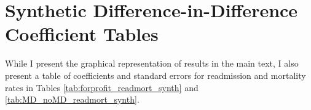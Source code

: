 \documentclass[12pt]{article}
\begin{document}




\section{Synthetic Difference-in-Difference Coefficient Tables}

While I present the graphical representation of results in the main text, I also present a table of coefficients and standard errors for readmission and mortality rates in Tables \ref{tab:forprofit_readmort_synth} and \ref{tab:MD_noMD_readmort_synth}.




    

    

    

    

    

    

	
	
	
\end{document}
